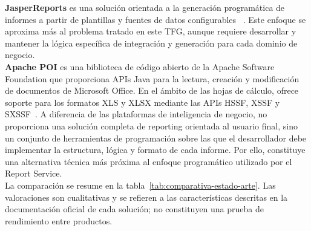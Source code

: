 \documentclass[11pt,a4paper,titlepage,oneside]{report}
\begin{document}
\textbf{JasperReports} es una solución orientada a la generación programática
de informes a partir de plantillas y fuentes de datos configurables
~\cite{JasperReportsDocs}. Este enfoque se aproxima más al problema tratado en
este TFG, aunque requiere desarrollar y mantener la lógica específica de
integración y generación para cada dominio de negocio. \\

\textbf{Apache POI} es una biblioteca de código abierto de la Apache Software
Foundation que proporciona APIs Java para la lectura, creación y modificación
de documentos de Microsoft Office. En el ámbito de las hojas de cálculo,
ofrece soporte para los formatos XLS y XLSX mediante las APIs HSSF, XSSF y
SXSSF~\cite{ApachePOIDocs}. A diferencia de las plataformas de inteligencia
de negocio, no proporciona una solución completa de reporting orientada al
usuario final, sino un conjunto de herramientas de programación sobre las que
el desarrollador debe implementar la estructura, lógica y formato de cada
informe. Por ello, constituye una alternativa técnica más próxima al enfoque
programático utilizado por el Report Service. \\

La comparación se resume en la
tabla~\ref{tab:comparativa-estado-arte}. Las valoraciones son cualitativas y
se refieren a las características descritas en la documentación oficial de
cada solución; no constituyen una prueba de rendimiento entre productos. \\
\end{document}
